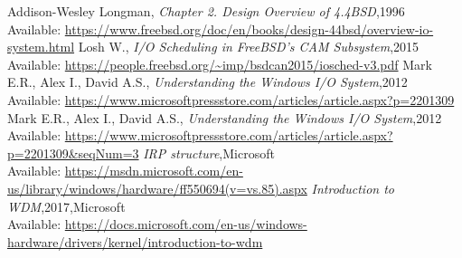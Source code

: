 \documentclass[onecolumn, draftclsnofoot,10pt, compsoc]{IEEEtran}
\begin{document}
\begin{thebibliography}{14}
\bibitem{}
Addison-Wesley Longman, \textit{Chapter 2. Design Overview of 4.4BSD},1996\\
Available: \url{https://www.freebsd.org/doc/en/books/design-44bsd/overview-io-system.html}
\bibitem{}
Losh W., \textit{I/O Scheduling in FreeBSD’s CAM Subsystem},2015 \\
Available: \url{https://people.freebsd.org/~imp/bsdcan2015/iosched-v3.pdf}
\bibitem{}
Mark E.R., Alex I., David A.S., \textit{Understanding the Windows I/O System},2012 \\
Available: \url{https://www.microsoftpressstore.com/articles/article.aspx?p=2201309}
\bibitem{}
Mark E.R., Alex I., David A.S., \textit{Understanding the Windows I/O System},2012 \\
Available: \url{https://www.microsoftpressstore.com/articles/article.aspx?p=2201309&seqNum=3}
\bibitem{}
\textit{IRP structure},Microsoft \\
Available: \url{https://msdn.microsoft.com/en-us/library/windows/hardware/ff550694(v=vs.85).aspx}
\bibitem{}
\textit{Introduction to WDM},2017,Microsoft \\
Available: \url{https://docs.microsoft.com/en-us/windows-hardware/drivers/kernel/introduction-to-wdm}
\end{thebibliography}
\end{document}
